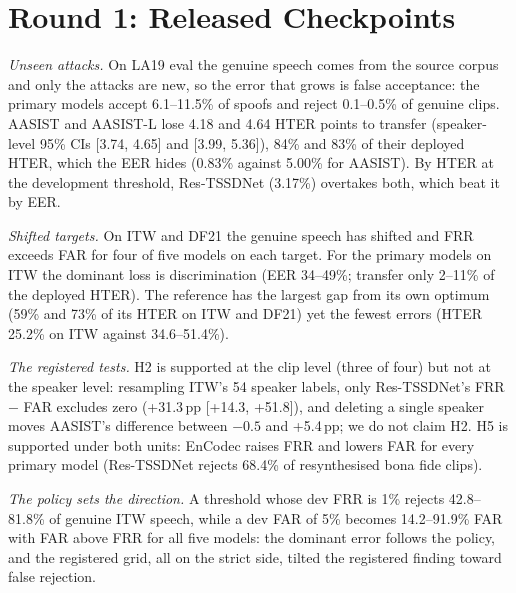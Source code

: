 \documentclass[journal]{IEEEtran}
\newcommand{\tauE}{\tau^{*}_{\mathrm{EER}}}
\begin{document}
\section{Round 1: Released Checkpoints}
\label{sec:round1}
\begin{table}[!t]
\caption{Round 1: operating behaviour at the frozen \(\tauE\) (fp32, \%). HTER = oracle HTER (discrimination) + TTG
(transfer, pp); TTG/HTER is the transfer share (\%). The CI of TTG is a speaker-cluster bootstrap (B = 1,000).}
\label{tab:op}
\centering
\footnotesize
\setlength{\tabcolsep}{5pt}

\end{table}

\emph{Unseen attacks.} On LA19 eval the genuine speech comes from the source corpus and only the attacks are new, so the
error that grows is false acceptance: the primary models accept 6.1--11.5\% of spoofs and reject 0.1--0.5\% of genuine
clips. AASIST and AASIST-L lose 4.18 and 4.64 HTER points to transfer (speaker-level 95\% CIs [3.74, 4.65] and
[3.99, 5.36]), 84\% and 83\% of their deployed HTER, which the EER hides (0.83\% against 5.00\% for AASIST). By HTER at the
development threshold, Res-TSSDNet (3.17\%) overtakes both, which beat it by EER.

\emph{Shifted targets.} On ITW and DF21 the genuine speech has shifted and FRR exceeds FAR for four of five models on each
target. For the primary models on ITW the dominant loss is discrimination (EER 34--49\%; transfer only 2--11\% of the
deployed HTER). The reference has the largest gap from its own optimum (59\% and 73\% of its HTER on ITW and DF21) yet the
fewest errors (HTER 25.2\% on ITW against 34.6--51.4\%).

\emph{The registered tests.} H2 is supported at the clip level (three of four) but not at the speaker level: resampling
ITW's 54 speaker labels, only Res-TSSDNet's FRR $-$ FAR excludes zero (+31.3\,pp [+14.3, +51.8]), and deleting a single
speaker moves AASIST's difference between $-0.5$ and +5.4\,pp; we do not claim H2. H5 is supported under both units:
EnCodec raises FRR and lowers FAR for every primary model (Res-TSSDNet rejects 68.4\% of resynthesised bona fide clips).

\emph{The policy sets the direction.} A threshold whose dev FRR is 1\% rejects 42.8--81.8\% of genuine ITW speech, while a
dev FAR of 5\% becomes 14.2--91.9\% FAR with FAR above FRR for all five models: the dominant error follows the policy, and
the registered grid, all on the strict side, tilted the registered finding toward false rejection.
\end{document}
